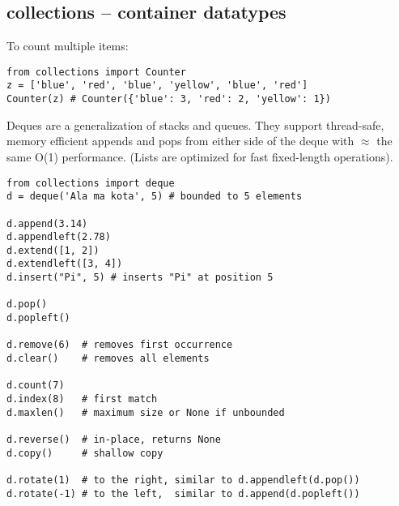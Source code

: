 %

\subsection{collections -- container datatypes}
To count multiple items:
\begin{verbatim}
from collections import Counter
z = ['blue', 'red', 'blue', 'yellow', 'blue', 'red']
Counter(z) # Counter({'blue': 3, 'red': 2, 'yellow': 1})
\end{verbatim}

Deques are a generalization of stacks and queues.
They support thread-safe, memory efficient appends and pops from either side of the deque with $\approx$ the same O(1) performance.
(Lists are optimized for fast fixed-length operations).

\begin{verbatim}
from collections import deque
d = deque('Ala ma kota', 5) # bounded to 5 elements

d.append(3.14)
d.appendleft(2.78)
d.extend([1, 2])
d.extendleft([3, 4])
d.insert("Pi", 5) # inserts "Pi" at position 5

d.pop()
d.popleft()

d.remove(6)  # removes first occurrence
d.clear()    # removes all elements

d.count(7)
d.index(8)   # first match
d.maxlen()   # maximum size or None if unbounded

d.reverse()  # in-place, returns None
d.copy()     # shallow copy

d.rotate(1)  # to the right, similar to d.appendleft(d.pop())
d.rotate(-1) # to the left,  similar to d.append(d.popleft())
\end{verbatim}

%
